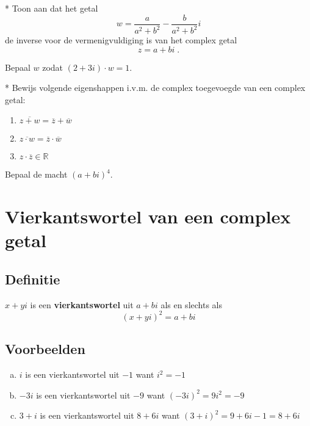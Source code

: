 \documentclass[12pt,twoside]{article}
\begin{document}
\begin{oefening}*
Toon aan dat het getal
$$w=\dfrac{a}{a^2+b^2}-\dfrac{b}{a^2+b^2}i$$
de inverse voor de vermenigvuldiging is van het complex getal
$$z=a+bi\;.$$
\end{oefening}

\begin{oefening}
Bepaal $w$ zodat $(2+3i)\cdot w = 1$.
\end{oefening}

\begin{oefening}*
Bewijs volgende eigenshappen i.v.m. de complex toegevoegde van een complex getal:
\begin{enumerate}[a]
  \item $\overline{z+w}=\overline{z}+\overline{w}$
  \item $\overline{z\cdot w}=\overline{z}\cdot\overline{w}$
  \item $z\cdot\overline{z}\in\mathbb{R}$
\end{enumerate}
\end{oefening}

\begin{oefening}
Bepaal de macht $(a+bi)^4$.
\end{oefening}

\pagebreak
\section{Vierkantswortel van een complex getal}

\subsection{Definitie}
\begin{mdframed}
$x+yi$ is een {\bf vierkantswortel} uit $a+bi$ als en slechts als
$$(x+yi)^2 = a+bi$$
\end{mdframed}

\subsection{Voorbeelden}
\begin{enumerate}[(a)]
  \item $i$ is een vierkantswortel uit $-1$ want $i^2 = -1$
  \item $-3i$ is een vierkantswortel uit $-9$ want $(-3i)^2 = 9i^2 = -9$
  \item $3+i$ is een vierkantswortel uit $8+6i$ want $(3+i)^2=9+6i-1 = 8+6i$
\end{enumerate}
\end{document}
